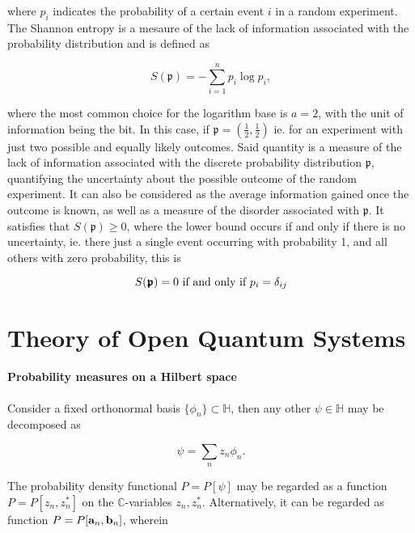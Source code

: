 \documentclass{homework}
\begin{document}
where $p_i$ indicates the probability of a certain event $i$ in a random experiment. The Shannon entropy is a mesaure of the lack of information associated with the probability distribution and is defined as 

\begin{equation}
    S(\bm{\mathfrak{p}}) = - \sum_{i=1}^{n} p_i \log p_i,
\end{equation}

where the most common choice for the logarithm base is $a=2$, with the unit of information being the bit. In this case, if $\bm{\mathfrak{p}} = \left(\frac{1}{2},\frac{1}{2}\right)$ ie. for an experiment with just two possible and equally likely outcomes. Said quantity is a measure of the lack of information associated with the discrete probability distribution $\bm{\mathfrak{p}}$, quantifying the uncertainty about the possible outcome of the random experiment. It can also be considered as the average information gained once the outcome is known, as well as a measure of the disorder associated with $\bm{\mathfrak{p}}$. It satisfies that $S(\bm{\mathfrak{p}}) \geq 0$, where the lower bound occurs if and only if there is no uncertainty, ie. there just a single event occurring with probability 1, and all others with zero probability, this is 

\begin{equation}
    S(\bm{\mathfrak{p}}) = 0 \textnormal{ if and only if } p_i = \delta_{ij}
\end{equation}

\clearpage

\section{Theory of Open Quantum Systems}

\paragraph{\textbf{Probability measures on a Hilbert space}}

Consider a fixed orthonormal basis $\{\phi_n\} \subset \mathds{H}$, then any other $\psi \in \mathds{H}$ may be decomposed as 

$$
    \psi = \sum_{n} z_n \phi_n.
$$

The probability density functional $P = P[\psi]$ may be regarded as a function $P = P[z_n, z_n^*]$ on the $\mathds{C}$-variables $z_n, z_n^*$. Alternatively, it can be regarded as function $P = P[{\bf a}_n, {\bf b}_n]$, wherein 
\end{document}
